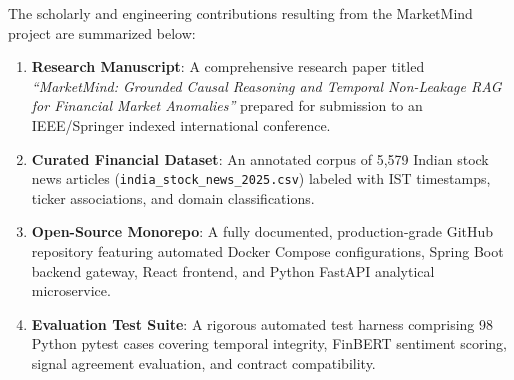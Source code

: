 \documentclass{article}
\begin{document}
	The scholarly and engineering contributions resulting from the MarketMind project are summarized below:
	\begin{enumerate}
		\item \textbf{Research Manuscript}: A comprehensive research paper titled \textit{``MarketMind: Grounded Causal Reasoning and Temporal Non-Leakage RAG for Financial Market Anomalies''} prepared for submission to an IEEE/Springer indexed international conference.
		\item \textbf{Curated Financial Dataset}: An annotated corpus of 5,579 Indian stock news articles (\texttt{india\_stock\_news\_2025.csv}) labeled with IST timestamps, ticker associations, and domain classifications.
		\item \textbf{Open-Source Monorepo}: A fully documented, production-grade GitHub repository featuring automated Docker Compose configurations, Spring Boot backend gateway, React frontend, and Python FastAPI analytical microservice.
		\item \textbf{Evaluation Test Suite}: A rigorous automated test harness comprising 98 Python pytest cases covering temporal integrity, FinBERT sentiment scoring, signal agreement evaluation, and contract compatibility.
	\end{enumerate}

	\pagebreak
\end{document}
